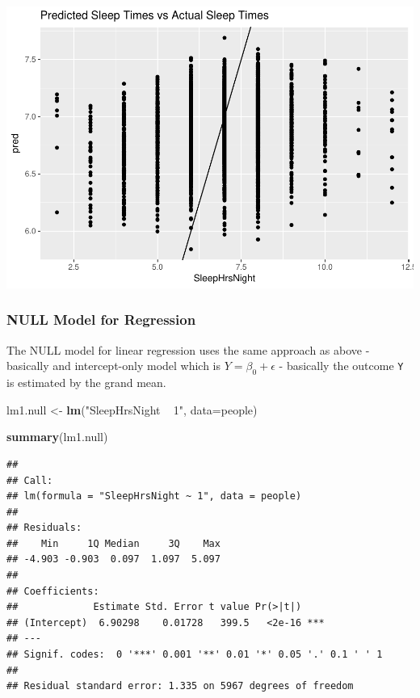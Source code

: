\documentclass[]{article}
\newenvironment{Shaded}{\begin{snugshade}}{\end{snugshade}}
\newcommand{\KeywordTok}[1]{\textcolor[rgb]{0.13,0.29,0.53}{\textbf{{#1}}}}
\newcommand{\DataTypeTok}[1]{\textcolor[rgb]{0.13,0.29,0.53}{{#1}}}
\newcommand{\StringTok}[1]{\textcolor[rgb]{0.31,0.60,0.02}{{#1}}}
\newcommand{\NormalTok}[1]{{#1}}
\begin{document}
\includegraphics{Hmwk7AnswerKey_files/figure-latex/unnamed-chunk-23-1.pdf}

\subsubsection{NULL Model for
Regression}\label{null-model-for-regression}

The NULL model for linear regression uses the same approach as above -
basically and intercept-only model which is \(Y = \beta_0 + \epsilon\) -
basically the outcome \texttt{Y} is estimated by the grand mean.

\begin{Shaded}
\begin{Highlighting}[]
\NormalTok{lm1.null <-}\StringTok{ }\KeywordTok{lm}\NormalTok{(}\StringTok{"SleepHrsNight ~ 1"}\NormalTok{, }\DataTypeTok{data=}\NormalTok{people)}

\KeywordTok{summary}\NormalTok{(lm1.null)}
\end{Highlighting}
\end{Shaded}

\begin{verbatim}
## 
## Call:
## lm(formula = "SleepHrsNight ~ 1", data = people)
## 
## Residuals:
##    Min     1Q Median     3Q    Max 
## -4.903 -0.903  0.097  1.097  5.097 
## 
## Coefficients:
##             Estimate Std. Error t value Pr(>|t|)    
## (Intercept)  6.90298    0.01728   399.5   <2e-16 ***
## ---
## Signif. codes:  0 '***' 0.001 '**' 0.01 '*' 0.05 '.' 0.1 ' ' 1
## 
## Residual standard error: 1.335 on 5967 degrees of freedom
\end{verbatim}

\begin{Shaded}
\end{Shaded}
\end{document}
